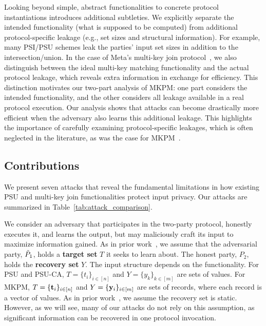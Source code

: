 Looking beyond simple, abstract functionalities to concrete protocol instantiations introduces additional subtleties. We explicitly separate the intended functionality (what is supposed to be computed) from additional protocol-specific leakage (e.g., set sizes and structural information). For example, many PSI/PSU schemes leak the parties’ input set sizes in addition to the intersection/union. In the case of Meta’s multi-key join protocol~\cite{MKPMC}, we also distinguish between the ideal multi-key matching functionality and the actual protocol leakage, which reveals extra information in exchange for efficiency.
This distinction motivates our two-part analysis of MKPM: one part considers the intended functionality, and the other considers all leakage available in a real protocol execution. Our analysis shows that attacks can become drastically more efficient when the adversary also learns this additional leakage. This highlights the importance of carefully examining protocol-specific leakages, which is often neglected in the literature, as was the case for MKPM~\cite{MKPMC}.



\subsection{Contributions}

We present seven attacks that reveal the fundamental limitations in how existing PSU and multi-key join functionalities protect input privacy.
Our attacks are summarized in Table~\ref{tab:attack_comparison}.

We consider an adversary that participates in the two-party protocol, honestly executes it, and learns the output, but may maliciously craft its input to maximize information gained. As in prior work~\cite{USENIX:GHLWJL22, NDSS:JiaDuYan24,USENIX:FalTan25}, we assume that the adversarial party, $\tilde{P}_1$, holds a \textbf{target set} $T$ it seeks to learn about. The honest party, $P_2$, holds the \textbf{recovery set} $Y$.
The input structure depends on the functionality. For PSU and PSU-CA, $T=\{t_i\}_{i\in[n]}$ and $Y=\{y_k\}_{k\in[m]}$ are sets of values. For MKPM, $T=\{\mathbf{t}_i\}_{i\in[n]}$ and $Y=\{\mathbf{y}_i\}_{i\in[m]}$ are sets of records, where each record is a vector of values. As in prior work~\cite{USENIX:FalTan25}, we assume the recovery set is static. However, as we will see, many of our attacks do not rely on this assumption, as significant information can be recovered in one protocol invocation.



